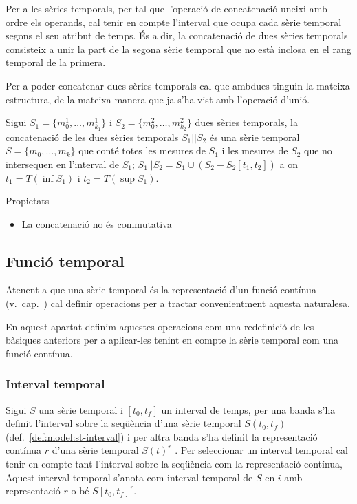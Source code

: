 Per a les sèries temporals, per tal que l'operació de concatenació
uneixi amb ordre els operands, cal tenir en compte l'interval que
ocupa cada sèrie temporal segons el seu atribut de temps.  És a dir,
la concatenació de dues sèries temporals consisteix a unir la part de
la segona sèrie temporal que no està inclosa en el rang temporal de la
primera.

Per a poder concatenar dues sèries temporals cal que ambdues tinguin
la mateixa estructura, de la mateixa manera que ja s'ha vist amb
l'operació d'unió.


\begin{definition}[concatenació]
  Sigui $S_1=\{m_0^1, \dotsc, m_{k_1}^1\}$ i $S_2=\{m_0^2, \dotsc,
  m_{k_2}^2\}$ dues sèries temporals, la concatenació de les dues
  sèries temporals $S_1 || S_2$ és una sèrie temporal $S=\{m_0,
  \dotsc, m_k\}$ que conté totes les mesures de $S_1$ i les mesures de
  $S_2$ que no intersequen en l'interval de $S_1$; $S_1 || S_2 = S_1
  \cup ( S_2 - S_2[t_1,t_2] )$ a on $t_1=T(\inf S_1)$ i $t_2=T(\sup
  S_1)$.
\end{definition}


Propietats
\begin{itemize}
\item La concatenació no és commutativa
\end{itemize}







\subsection{Funció temporal}
\label{sec:sgst:operadors-temporals}

Atenent a que una sèrie temporal és la representació d'un funció
contínua (v.\ cap.~)
cal definir operacions per a tractar convenientment aquesta
naturalesa.

En aquest apartat definim aquestes operacions com una redefinició de
les bàsiques anteriors per a aplicar-les tenint en compte la sèrie
temporal com una funció contínua.



\subsubsection{Interval temporal}

Sigui $S$ una sèrie temporal i $[t_0,t_f]$ un interval de temps, per
una banda s'ha definit l'interval sobre la seqüència d'una sèrie
temporal $S(t_0,t_f)$ (def.~\ref{def:model:st-interval}) i per altra
banda s'ha definit la representació contínua $r$ d'una sèrie temporal
$S(t)^r$ .  Per seleccionar un
interval temporal cal tenir en compte tant l'interval sobre la
seqüència com la representació contínua, Aquest interval temporal
s'anota com interval temporal de $S$ en $i$ amb representació $r$ o bé
$S[t_0,t_f]^r$.



